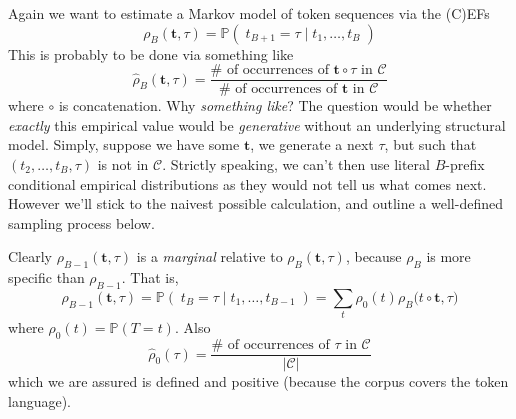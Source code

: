 \documentclass[11pt, oneside]{amsart}   	%
\begin{document}
Again we want to estimate a Markov model of token sequences via the (C)EFs
\begin{equation*}
	\rho_B(\mathbf{t}, \tau) = \mathbb{P}(\; t_{B+1} = \tau \; | \; t_1, \dotsc , t_B \; )
\end{equation*}
This is probably to be done via something like
\begin{equation*}
	\hat{\rho}_B(\mathbf{t},\tau) 
		= \frac{ \#\text{ of occurrences of }\mathbf{t} \circ \tau\text{ in }\mathcal{C} }
			{ \#\text{ of occurrences of }\mathbf{t}\text{ in }\mathcal{C} }
\end{equation*}
where $\circ$ is concatenation. Why {\em something like}? The question would be whether {\em exactly} this empirical value would be {\em generative} without an underlying structural model. Simply, suppose we have some $\mathbf{t}$, we generate a next $\tau$, but such that $(t_2,\dotsc,t_B,\tau)$ is not in $\mathcal{C}$. Strictly speaking, we can't then use literal $B$-prefix conditional empirical distributions as they would not tell us what comes next. However we'll stick to the naivest possible calculation, and outline a well-defined sampling process below. 

Clearly $\rho_{B-1}(\mathbf{t}, \tau)$ is a {\em marginal} relative to $\rho_B(\mathbf{t}, \tau)$, because $\rho_B$ is more specific than $\rho_{B-1}$. That is, 
\begin{equation*}
	\rho_{B-1}(\mathbf{t}, \tau) 
		= \mathbb{P}(\; t_{B} = \tau \; | \; t_1, \dotsc , t_{B-1} \; )
		= \sum_t \rho_{0}(t) \rho_B\big( t \circ \mathbf{t}, \tau\big)
\end{equation*}
where $\rho_{0}(t) = \mathbb{P}(T = t)$. Also
\begin{equation*}
	\hat{\rho}_{0}(\tau) = \frac{\#\text{ of occurrences of }\tau\text{ in }\mathcal{C}}{|\mathcal{C}|}
\end{equation*}
which we are assured is defined and positive (because the corpus covers the token language). 
\end{document}
